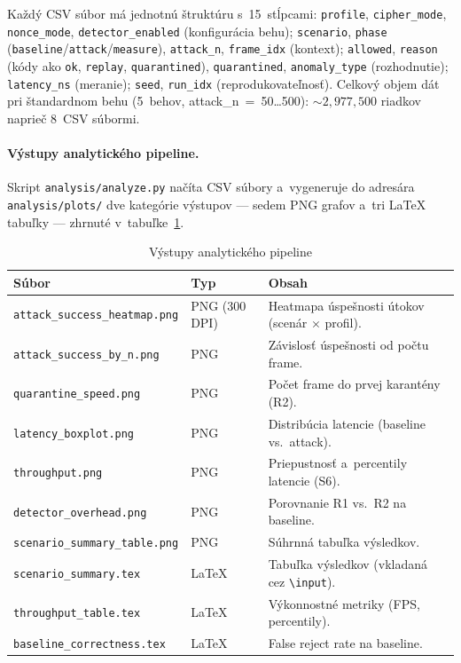 \documentclass[a4paper]{feidipsp}
\begin{document}
\noindent Každý CSV súbor má jednotnú štruktúru s~15~stĺpcami: \texttt{profile}, \texttt{cipher\_mode}, \texttt{nonce\_mode}, \texttt{detector\_enabled} (konfigurácia behu); \texttt{scenario}, \texttt{phase} (\texttt{baseline}/\texttt{attack}/\texttt{measure}), \texttt{attack\_n}, \texttt{frame\_idx} (kontext); \texttt{allowed}, \texttt{reason} (kódy ako \texttt{ok}, \texttt{replay}, \texttt{quarantined}), \texttt{quarantined}, \texttt{anomaly\_type} (rozhodnutie); \texttt{latency\_ns} (meranie); \texttt{seed}, \texttt{run\_idx} (reprodukovateľnosť). Celkový objem dát pri štandardnom behu (5~behov, attack\_n~=~50\ldots500): ${\sim}2{,}977{,}500$ riadkov naprieč 8~CSV súbormi.

\paragraph{Výstupy analytického pipeline.}
Skript \texttt{analysis/analyze.py} načíta CSV súbory a~vygeneruje do adresára \texttt{analysis/plots/} dve kategórie výstupov --- sedem PNG grafov a~tri \LaTeX{} tabuľky --- zhrnuté v~tabuľke~\ref{t:analysis-outputs}.

\begin{table}[!htbp]
\centering
\footnotesize
\renewcommand{\arraystretch}{1.15}
\caption{Výstupy analytického pipeline}\label{t:analysis-outputs}
\begin{tabular}{|l|l|p{4.8cm}|} \hline
\textbf{Súbor} & \textbf{Typ} & \textbf{Obsah} \\ \hline
\texttt{attack\_success\_heatmap.png}  & PNG (300\,DPI) & Heatmapa úspešnosti útokov (scenár $\times$ profil). \\ \hline
\texttt{attack\_success\_by\_n.png}    & PNG & Závislosť úspešnosti od počtu frame. \\ \hline
\texttt{quarantine\_speed.png}         & PNG & Počet frame do prvej karantény (R2). \\ \hline
\texttt{latency\_boxplot.png}          & PNG & Distribúcia latencie (baseline vs.\ attack). \\ \hline
\texttt{throughput.png}                & PNG & Priepustnosť a~percentily latencie (S6). \\ \hline
\texttt{detector\_overhead.png}        & PNG & Porovnanie R1 vs.\ R2 na baseline. \\ \hline
\texttt{scenario\_summary\_table.png}  & PNG & Súhrnná tabuľka výsledkov. \\ \hline
\texttt{scenario\_summary.tex}         & \LaTeX{} & Tabuľka výsledkov (vkladaná cez \texttt{\textbackslash input}). \\ \hline
\texttt{throughput\_table.tex}         & \LaTeX{} & Výkonnostné metriky (FPS, percentily). \\ \hline
\texttt{baseline\_correctness.tex}     & \LaTeX{} & False reject rate na baseline. \\ \hline
\end{tabular}
\end{table}
\end{document}

